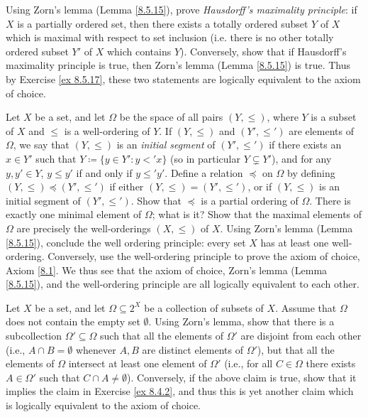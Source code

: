 \begin{exercise}\label{ex 8.5.18}
    Using Zorn's lemma (Lemma \ref{8.5.15}), prove \emph{Hausdorff's maximality principle}:
    if \(X\) is a partially ordered set, then there exists a totally ordered subset \(Y\) of \(X\) which is maximal with respect to set inclusion
    (i.e. there is no other totally ordered subset \(Y'\) of \(X\) which contains \(Y\)).
    Conversely, show that if Hausdorff's maximality principle is true, then Zorn's lemma (Lemma \ref{8.5.15}) is true.
    Thus by Exercise \ref{ex 8.5.17}, these two statements are logically equivalent to the axiom of choice.
\end{exercise}

\begin{exercise}\label{ex 8.5.19}
    Let \(X\) be a set, and let \(\Omega\) be the space of all pairs \((Y, \leq)\), where \(Y\) is a subset of \(X\) and \(\leq\) is a well-ordering of \(Y\).
    If \((Y, \leq)\) and \((Y', \leq')\) are elements of \(\Omega\), we say that \((Y, \leq)\) is an \emph{initial segment} of \((Y', \leq')\) if there exists an \(x \in Y'\) such that \(Y \coloneqq \{y \in Y' : y <' x\}\) (so in particular \(Y \subsetneq Y'\)), and for any \(y, y' \in Y\), \(y \leq y'\) if and only if \(y \leq' y'\).
    Define a relation \(\preceq\) on \(\Omega\) by defining \((Y, \leq) \preceq (Y', \leq')\) if either \((Y, \leq) = (Y', \leq')\), or if \((Y, \leq)\) is an initial segment of \((Y', \leq')\).
    Show that \(\preceq\) is a partial ordering of \(\Omega\).
    There is exactly one minimal element of \(\Omega\);
    what is it?
    Show that the maximal elements of \(\Omega\) are precisely the well-orderings \((X, \leq)\) of \(X\).
    Using Zorn's lemma (Lemma \ref{8.5.15}), conclude the well ordering principle:
    every set \(X\) has at least one well-ordering.
    Conversely, use the well-ordering principle to prove the axiom of choice, Axiom \ref{8.1}.
    We thus see that the axiom of choice, Zorn's lemma (Lemma \ref{8.5.15}), and the well-ordering principle are all logically equivalent to each other.
\end{exercise}

\begin{exercise}\label{ex 8.5.20}
    Let \(X\) be a set, and let \(\Omega \subseteq 2^X\) be a collection of subsets of \(X\).
    Assume that \(\Omega\) does not contain the empty set \(\emptyset\).
    Using Zorn's lemma, show that there is a subcollection \(\Omega' \subseteq \Omega\) such that all the elements of \(\Omega'\) are disjoint from each other (i.e., \(A \cap B = \emptyset\) whenever \(A, B\) are distinct elements of \(\Omega'\)), but that all the elements of \(\Omega\) intersect at least one element of \(\Omega'\) (i.e., for all \(C \in \Omega\) there exists \(A \in \Omega'\) such that \(C \cap A \neq \emptyset\)).
    Conversely, if the above claim is true, show that it implies the claim in Exercise \ref{ex 8.4.2}, and thus this is yet another claim which is logically equivalent to the axiom of choice.
\end{exercise}
